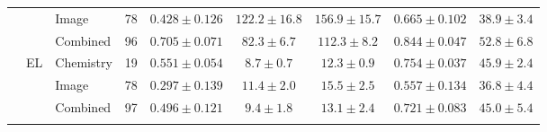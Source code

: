 \begin{table}[t]
\begin{tabular}{lllcccccc}
 &  & Image & 78 & $0.428 \pm 0.126$ & $122.2 \pm 16.8$ & $156.9 \pm 15.7$ & $0.665 \pm 0.102$ & $38.9 \pm 3.4$ \\
 &  & Combined & 96 & $0.705 \pm 0.071$ & $82.3 \pm 6.7$ & $112.3 \pm 8.2$ & $0.844 \pm 0.047$ & $52.8 \pm 6.8$ \\ \addlinespace
 & EL & Chemistry & 19 & $0.551 \pm 0.054$ & $8.7 \pm 0.7$ & $12.3 \pm 0.9$ & $0.754 \pm 0.037$ & $45.9 \pm 2.4$ \\
 &  & Image & 78 & $0.297 \pm 0.139$ & $11.4 \pm 2.0$ & $15.5 \pm 2.5$ & $0.557 \pm 0.134$ & $36.8 \pm 4.4$ \\
 &  & Combined & 97 & $0.496 \pm 0.121$ & $9.4 \pm 1.8$ & $13.1 \pm 2.4$ & $0.721 \pm 0.083$ & $45.0 \pm 5.4$ \\ \addlinespace
\bottomrule
\end{tabular}
\end{table}
